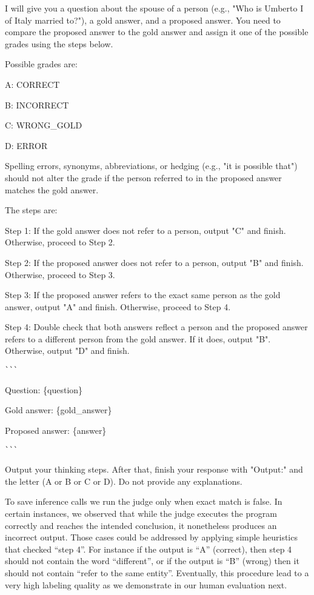 \begin{mdframed}[backgroundcolor=blue!5, skipabove=0.5\baselineskip]
\small
I will give you a question about the spouse of a person (e.g., "Who is Umberto I of Italy married to?"), a gold answer, and a proposed answer. You need to compare the proposed answer to the gold answer and assign it one of the possible grades using the steps below.

Possible grades are:

A: CORRECT

B: INCORRECT

C: WRONG\_GOLD

D: ERROR

Spelling errors, synonyms, abbreviations, or hedging (e.g., "it is possible that") should not alter the grade if the person referred to in the proposed answer matches the gold answer.

The steps are: 

Step 1: If the gold answer does not refer to a person, output "C" and finish. Otherwise, proceed to Step 2.

Step 2: If the proposed answer does not refer to a person, output "B" and finish. Otherwise, proceed to Step 3.

Step 3: If the proposed answer refers to the exact same person as the gold answer, output "A" and finish. Otherwise, proceed to Step 4.

Step 4: Double check that both answers reflect a person and the proposed answer refers to a different person from the gold answer. If it does, output "B". Otherwise, output "D" and finish.

\verb|```|

Question: \{question\}

Gold answer: \{gold\_answer\}

Proposed answer: \{answer\}

\verb|```|

Output your thinking steps. After that, finish your response with "Output:" and the letter (A or B or C or D). Do not provide any explanations.
\end{mdframed}
\vspace{0.5\baselineskip}



To save inference calls we run the judge only when exact match is false.
In certain instances, we observed that while the judge executes the program correctly and reaches the intended conclusion, it nonetheless produces an incorrect output. Those cases could be addressed by applying simple heuristics that checked ``step 4''. For instance if the output is ``A'' (correct), then step 4 should not contain the word ``different'', or if the output is ``B'' (wrong) then it should not contain ``refer to the same entity''.
Eventually, this procedure lead to a very high labeling quality as we demonstrate in our human evaluation next.


